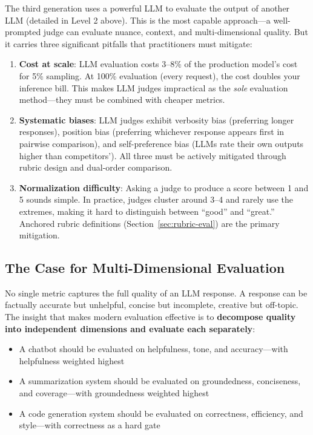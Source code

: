 The third generation uses a powerful LLM to evaluate the output of another LLM (detailed in Level 2 above). This is the most capable approach---a well-prompted judge can evaluate nuance, context, and multi-dimensional quality. But it carries three significant pitfalls that practitioners must mitigate:

\begin{enumerate}[leftmargin=*]
    \item \textbf{Cost at scale}: LLM evaluation costs 3--8\% of the production model's cost for 5\% sampling. At 100\% evaluation (every request), the cost doubles your inference bill. This makes LLM judges impractical as the \emph{sole} evaluation method---they must be combined with cheaper metrics.
    \item \textbf{Systematic biases}: LLM judges exhibit verbosity bias (preferring longer responses), position bias (preferring whichever response appears first in pairwise comparison), and self-preference bias (LLMs rate their own outputs higher than competitors'). All three must be actively mitigated through rubric design and dual-order comparison.
    \item \textbf{Normalization difficulty}: Asking a judge to produce a score between 1 and 5 sounds simple. In practice, judges cluster around 3--4 and rarely use the extremes, making it hard to distinguish between ``good'' and ``great.'' Anchored rubric definitions (Section~\ref{sec:rubric-eval}) are the primary mitigation.
\end{enumerate}

\subsection{The Case for Multi-Dimensional Evaluation}

No single metric captures the full quality of an LLM response. A response can be factually accurate but unhelpful, concise but incomplete, creative but off-topic. The insight that makes modern evaluation effective is to \textbf{decompose quality into independent dimensions and evaluate each separately}:

\begin{itemize}[leftmargin=*]
    \item A chatbot should be evaluated on helpfulness, tone, and accuracy---with helpfulness weighted highest
    \item A summarization system should be evaluated on groundedness, conciseness, and coverage---with groundedness weighted highest
    \item A code generation system should be evaluated on correctness, efficiency, and style---with correctness as a hard gate
\end{itemize}

